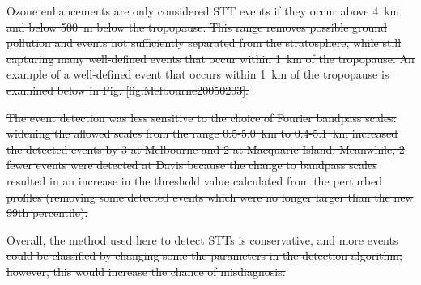 \documentclass[acp, manuscript]{copernicus} %
\providecommand{\DIFdel}[1]{{\protect\color{red}\sout{#1}}}                      %
\begin{document}
\DIFdel{Ozone enhancements are only considered STT events if they occur above 4~km and below 500~m below the tropopause.
    This range removes possible ground pollution and events not sufficiently separated from the stratosphere, while still capturing many well-defined events that occur within 1~km of the tropopause.
    An example of a well-defined event that occurs within 1~km of the tropopause is examined below in Fig. \ref{fig:Melbourne20050203}.
    }%

\DIFdel{The event detection was less sensitive to the choice of Fourier bandpass scales: widening the allowed scales from the range 0.5-5.0~km to 0.4-5.1~km increased the detected events by 3 at Melbourne and 2 at Macquarie Island. Meanwhile, 2 fewer events were detected at Davis because the change to bandpass scales resulted in an increase in the threshold value calculated from the perturbed profiles (removing some detected events which were no longer larger than the new 99th percentile).
    }%

\DIFdel{Overall, the method used here to detect STTs is conservative, and more events could be classified by changing some the parameters in the detection algorithm; however, this would increase the chance of misdiagnosis. 
}%

\end{document}
